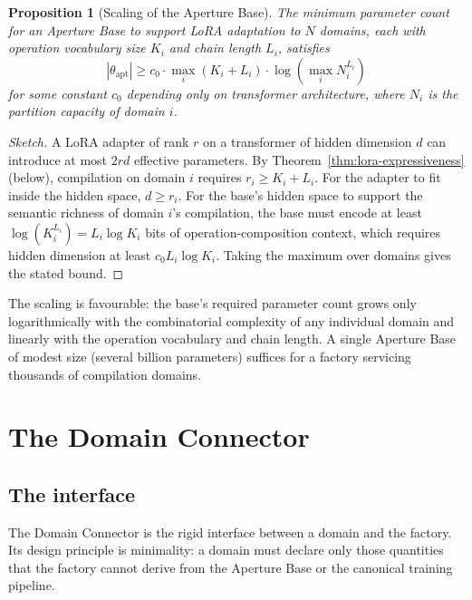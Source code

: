 \documentclass[twocolumn,11pt,a4paper]{article}
\newtheorem{proposition}[theorem]{Proposition}
\begin{document}
\begin{proposition}[Scaling of the Aperture Base]
\label{prop:aperture-scaling}
The minimum parameter count for an Aperture Base to support LoRA adaptation to $N$ domains, each with operation vocabulary size $K_i$ and chain length $L_i$, satisfies
\begin{equation}
|\theta_{\mathrm{apt}}| \geq c_0 \cdot \max_i (K_i + L_i) \cdot \log(\max_i N_i^{L_i})
\end{equation}
for some constant $c_0$ depending only on transformer architecture, where $N_i$ is the partition capacity of domain $i$.
\end{proposition}

\begin{proof}[Sketch]
A LoRA adapter of rank $r$ on a transformer of hidden dimension $d$ can introduce at most $2rd$ effective parameters. By Theorem~\ref{thm:lora-expressiveness} (below), compilation on domain $i$ requires $r_i \geq K_i + L_i$. For the adapter to fit inside the hidden space, $d \geq r_i$. For the base's hidden space to support the semantic richness of domain $i$'s compilation, the base must encode at least $\log(K_i^{L_i}) = L_i \log K_i$ bits of operation-composition context, which requires hidden dimension at least $c_0 L_i \log K_i$. Taking the maximum over domains gives the stated bound.
\end{proof}

The scaling is favourable: the base's required parameter count grows only logarithmically with the combinatorial complexity of any individual domain and linearly with the operation vocabulary and chain length. A single Aperture Base of modest size (several billion parameters) suffices for a factory servicing thousands of compilation domains.


\section{The Domain Connector}
\label{sec:connector}

\subsection{The interface}

The Domain Connector is the rigid interface between a domain and the factory. Its design principle is minimality: a domain must declare only those quantities that the factory cannot derive from the Aperture Base or the canonical training pipeline.
\end{document}
